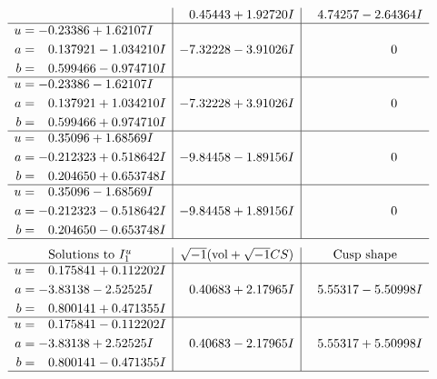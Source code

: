 \documentclass[1p]{elsarticle_modified}
\theoremstyle{definition}
\newcommand{\I}{\sqrt{-1}}
\begin{document}
$$\begin{array}{c|c|c}
 & \phantom{-}0.45443 + 1.92720 I & \phantom{-}4.74257 - 2.64364 I \\ \hline\begin{aligned}
u &= -0.23386 + 1.62107 I \\
a &= \phantom{-}0.137921 - 1.034210 I \\
b &= \phantom{-}0.599466 - 0.974710 I\end{aligned}
 & -7.32228 - 3.91026 I & \phantom{-0.000000 } 0 \\ \hline\begin{aligned}
u &= -0.23386 - 1.62107 I \\
a &= \phantom{-}0.137921 + 1.034210 I \\
b &= \phantom{-}0.599466 + 0.974710 I\end{aligned}
 & -7.32228 + 3.91026 I & \phantom{-0.000000 } 0 \\ \hline\begin{aligned}
u &= \phantom{-}0.35096 + 1.68569 I \\
a &= -0.212323 + 0.518642 I \\
b &= \phantom{-}0.204650 + 0.653748 I\end{aligned}
 & -9.84458 - 1.89156 I & \phantom{-0.000000 } 0 \\ \hline\begin{aligned}
u &= \phantom{-}0.35096 - 1.68569 I \\
a &= -0.212323 - 0.518642 I \\
b &= \phantom{-}0.204650 - 0.653748 I\end{aligned}
 & -9.84458 + 1.89156 I & \phantom{-0.000000 } 0\\
 \hline 
 \end{array}$$\newpage$$\begin{array}{c|c|c}  
\text{Solutions to }I^u_{1}& \I (\text{vol} + \sqrt{-1}CS) & \text{Cusp shape}\\
 \hline 
\begin{aligned}
u &= \phantom{-}0.175841 + 0.112202 I \\
a &= -3.83138 - 2.52525 I \\
b &= \phantom{-}0.800141 + 0.471355 I\end{aligned}
 & \phantom{-}0.40683 + 2.17965 I & \phantom{-}5.55317 - 5.50998 I \\ \hline\begin{aligned}
u &= \phantom{-}0.175841 - 0.112202 I \\
a &= -3.83138 + 2.52525 I \\
b &= \phantom{-}0.800141 - 0.471355 I\end{aligned}
 & \phantom{-}0.40683 - 2.17965 I & \phantom{-}5.55317 + 5.50998 I\\
 \hline 
 \end{array}$$\newpage\newpage\renewcommand{\arraystretch}{1}
\end{document}
